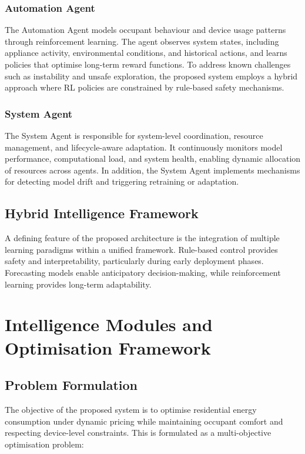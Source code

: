 \documentclass[11pt,a4paper]{article}
\begin{document}
\subsubsection{Automation Agent}

The Automation Agent models occupant behaviour and device usage patterns through reinforcement learning. The agent observes system states, including appliance activity, environmental conditions, and historical actions, and learns policies that optimise long-term reward functions. To address known challenges such as instability and unsafe exploration, the proposed system employs a hybrid approach where RL policies are constrained by rule-based safety mechanisms.

\subsubsection{System Agent}

The System Agent is responsible for system-level coordination, resource management, and lifecycle-aware adaptation. It continuously monitors model performance, computational load, and system health, enabling dynamic allocation of resources across agents. In addition, the System Agent implements mechanisms for detecting model drift and triggering retraining or adaptation.

\subsection{Hybrid Intelligence Framework}

A defining feature of the proposed architecture is the integration of multiple learning paradigms within a unified framework. Rule-based control provides safety and interpretability, particularly during early deployment phases. Forecasting models enable anticipatory decision-making, while reinforcement learning provides long-term adaptability.

\section{Intelligence Modules and Optimisation Framework}
\label{sec:intelligence}

\subsection{Problem Formulation}

The objective of the proposed system is to optimise residential energy consumption under dynamic pricing while maintaining occupant comfort and respecting device-level constraints. This is formulated as a multi-objective optimisation problem:
\end{document}
